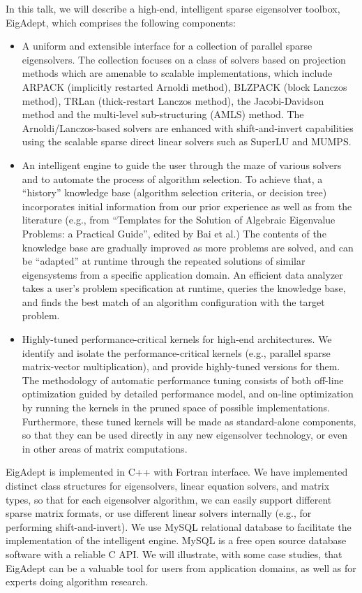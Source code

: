\documentclass[twosided]{report}
\begin{document}
In this talk, we will describe a
high-end, intelligent sparse eigensolver toolbox, EigAdept,
which comprises the following components:

\begin{itemize}
\item A uniform and extensible interface for a collection
of parallel sparse eigensolvers. The collection focuses on a
class of solvers based on projection methods which are
amenable to scalable implementations, which include ARPACK
(implicitly restarted Arnoldi method), BLZPACK (block
Lanczos method), TRLan (thick-restart Lanczos method), the
Jacobi-Davidson method and the multi-level sub-structuring
(AMLS) method. The Arnoldi/Lanczos-based solvers are
enhanced with shift-and-invert capabilities using the
scalable sparse direct linear solvers such as SuperLU and
MUMPS.

\item An intelligent engine to guide the user
through the maze of various solvers and to automate the
process of algorithm selection. To achieve that, a ``history''
knowledge base (algorithm selection criteria, or decision
tree) incorporates initial information from our prior
experience as well as from the literature (e.g., from
``Templates for the Solution of Algebraic Eigenvalue
Problems: a Practical Guide'', edited by Bai et al.) The
contents of the knowledge base are gradually improved as
more problems are solved, and can be ``adapted'' at runtime
through the repeated solutions of similar eigensystems from
a specific application domain. An efficient data analyzer
takes a user's problem specification at runtime, queries the
knowledge base, and finds the best match of an algorithm
configuration with the target problem.

\item Highly-tuned
performance-critical kernels for high-end architectures. We
identify and isolate the performance-critical kernels (e.g.,
parallel sparse matrix-vector multiplication), and provide
highly-tuned versions for them. The methodology of automatic
performance tuning consists of both off-line optimization
guided by detailed performance model, and on-line
optimization by running the kernels in the pruned space of
possible implementations. Furthermore, these tuned kernels
will be made as standard-alone components, so that they can
be used directly in any new eigensolver technology, or even
in other areas of matrix computations.
\end{itemize}

EigAdept is implemented in C++ with Fortran interface. We
have implemented distinct class structures for eigensolvers,
linear equation solvers, and matrix types, so that for each
eigensolver algorithm, we can easily support different
sparse matrix formats, or use different linear solvers
internally (e.g., for performing shift-and-invert). We use
MySQL relational database to facilitate the implementation
of the intelligent engine. MySQL is a free open source
database software with a reliable C API. We will illustrate,
with some case studies, that EigAdept can be a valuable tool
for users from application domains, as well as for experts
doing algorithm research.
\end{document}
